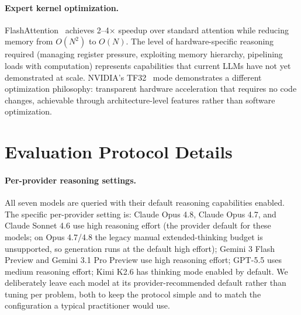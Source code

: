 \documentclass[]{fairmeta}
\begin{document}
\paragraph{Expert kernel optimization.}
FlashAttention~\citep{flashattention} achieves 2--4$\times$ speedup over standard attention while reducing memory from $O(N^2)$ to $O(N)$.
The level of hardware-specific reasoning required (managing register pressure, exploiting memory hierarchy, pipelining loads with computation) represents capabilities that current LLMs have not yet demonstrated at scale.
NVIDIA's TF32~\citep{tf32nvidia} mode demonstrates a different optimization philosophy: transparent hardware acceleration that requires no code changes, achievable through architecture-level features rather than software optimization.

\section{Evaluation Protocol Details}
\label{app:eval_protocol}

\paragraph{Per-provider reasoning settings.} All seven models are queried with their default reasoning capabilities enabled. The specific per-provider setting is: Claude Opus 4.8, Claude Opus 4.7, and Claude Sonnet 4.6 use high reasoning effort (the provider default for these models; on Opus 4.7/4.8 the legacy manual extended-thinking budget is unsupported, so generation runs at the default high effort); Gemini 3 Flash Preview and Gemini 3.1 Pro Preview use high reasoning effort; GPT-5.5 uses medium reasoning effort; Kimi K2.6 has thinking mode enabled by default. We deliberately leave each model at its provider-recommended default rather than tuning per problem, both to keep the protocol simple and to match the configuration a typical practitioner would use.
\end{document}
